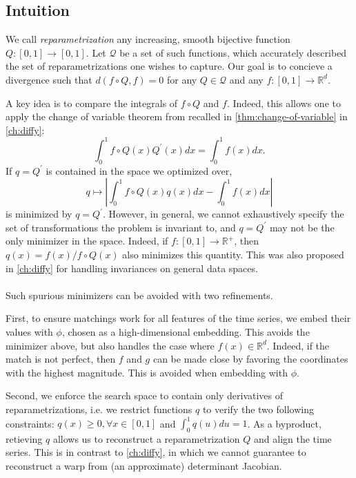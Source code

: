 \subsection{Intuition}\label{sec:diffytw-intuition}
We call \emph{reparametrization} any increasing, smooth bijective function $Q:[0,1] \to [0,1]$. Let $\mathcal Q$ be a set of such functions, which accurately described the set of reparametrizations one wishes to capture. Our goal is to concieve a divergence such that $d(f\circ Q, f) = 0$ for any $Q\in\mathcal Q$ and any $f:[0,1] \to \mathbb R^d$.

A key idea is to compare the integrals of $f\circ Q$ and $f$. Indeed, this allows one to apply the change of variable theorem from \cite{aliprantis1998principles} recalled in \cref{thm:change-of-variable} in \cref{ch:diffy}:
\begin{equation}
    \int_0^1 f\circ Q(x)Q^\prime(x)dx = \int_0^1 f(x)dx.
\end{equation}
If $q = Q^\prime$ is contained in the space we optimized over,
\begin{equation}
    q \mapsto \left\vert\int_0^1 f\circ Q(x)q(x) dx - \int_0^1 f(x)dx\right\vert
\end{equation}
is minimized by $q=Q^\prime$. However, in general, we cannot exhaustively specify the set of transformations the problem is invariant to, and $q=Q^\prime$ may not be the only minimizer in the space. Indeed, if $f:[0,1] \to \mathbb R^+$, then $q(x) = f(x) / f\circ Q(x)$ also minimizes this quantity.
This was also proposed in \cref{ch:diffy} for handling invariances on general data spaces.

\paragraph{}
Such spurious minimizers can be avoided with two refinements.

First, to ensure matchings work for all features of the time series, we embed their values with $\phi$, chosen as a high-dimensional embedding. This avoids the minimizer above, but also handles the case where $f(x)\in\mathbb R^d$. Indeed, if the match is not perfect, then $f$ and $g$ can be made close by favoring the coordinates with the highest magnitude. This is avoided when embedding with $\phi$.

Second, we enforce the search space to contain only derivatives of reparametrizations, i.e. we restrict functions $q$ to verify the two following constraints: $q(x) \geq 0, \forall x\in[0,1]$ and $\int_0^1 q(u)du=1$. As a byproduct, retieving $q$ allows us to reconstruct a reparametrization $Q$ and align the time series. This is in contrast to \cref{ch:diffy}, in which we cannot guarantee to reconstruct a warp from (an approximate) determinant Jacobian.


